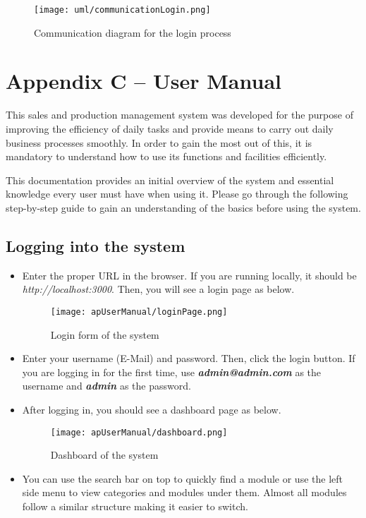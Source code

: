 \documentclass[12pt]{report}
\begin{document}
\begin{figure}[H]
	\centering
	\texttt{[image: uml/communicationLogin.png]}
	\caption{Communication diagram for the login process}
	\label{fig:communicationLogin}
\end{figure}

\setcounter{chapter}{3}
\setcounter{section}{0}
\setcounter{figure}{0}
\chapter*{\Huge Appendix C – User Manual}
This sales and production management system was developed for the purpose of improving the efficiency of daily tasks and provide means to carry out daily business processes smoothly. In order to gain the most out of this, it is mandatory to understand how to use its functions and facilities efficiently.

This documentation provides an initial overview of the system and essential knowledge every user must have when using it. Please go through the following step-by-step guide to gain an understanding of the basics before using the system.

\section{Logging into the system}

\begin{itemize}
	\item Enter the proper URL in the browser. If you are running locally, it should be {\it{http://localhost:3000}}. Then, you will see a login page as below.

	      \begin{figure}[H]
		      \centering
		      \texttt{[image: apUserManual/loginPage.png]}
		      \caption{Login form of the system}
	      \end{figure}

	\item Enter your username (E-Mail) and password. Then, click the login button. If you are logging in for the first time, use {\it\bf{admin@admin.com}} as the username and {\it\bf{admin}} as the password.
	\item After logging in, you should see a dashboard page as below.

	      \begin{figure}[H]
		      \centering
		      \texttt{[image: apUserManual/dashboard.png]}
		      \caption{Dashboard of the system}
	      \end{figure}

	\item You can use the search bar on top to quickly find a module or use the left side menu to view categories and modules under them. Almost all modules follow a similar structure making it easier to switch.

\end{itemize}
\end{document}
